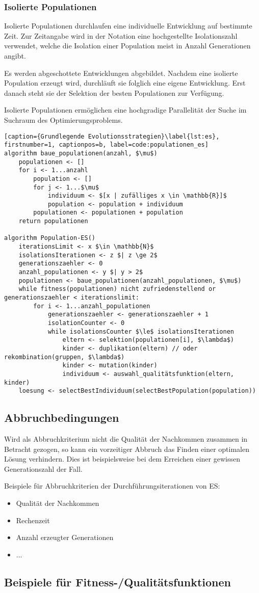 \subsubsection{Isolierte Populationen}

Isolierte Populationen durchlaufen eine individuelle Entwicklung auf bestimmte Zeit.
Zur Zeitangabe wird in der Notation eine hochgestellte Isolationszahl verwendet, welche die Isolation einer Population meist in Anzahl Generationen angibt.

Es werden abgeschottete Entwicklungen abgebildet.
Nachdem eine isolierte Population erzeugt wird, durchläuft sie folglich eine eigene Entwicklung.
Erst danach steht sie der Selektion der besten Populationen zur Verfügung.

Isolierte Populationen ermöglichen eine hochgradige Parallelität der Suche im Suchraum des Optimierungsproblems.

\begin{lstlisting}[caption={Grundlegende Evolutionsstrategien}\label{lst:es}, firstnumber=1, captionpos=b, label=code:populationen_es]
algorithm baue_populationen(anzahl, $\mu$)
	populationen <- []
	for i <- 1...anzahl
		population <- []	
		for j <- 1...$\mu$
			individuum <- $[x | zufälliges x \in \mathbb{R}]$
			population <- population + individuum
		populationen <- populationen + population
	return populationen

algorithm Population-ES()
	iterationsLimit <- x $\in \mathbb{N}$
	isolationsIterationen <- z $| z \ge 2$
	generationszaehler <- 0
	anzahl_populationen <- y $| y > 2$
	populationen <- baue_populationen(anzahl_populationen, $\mu$)
	while fitness(populationen) nicht zufriedenstellend or generationszaehler < iterationslimit:
		for i <- 1...anzahl_populationen
			generationszaehler <- generationszaehler + 1
			isolationCounter <- 0			
			while isolationsCounter $\le$ isolationsIterationen
				eltern <- selektion(populationen[i], $\lambda$)
				kinder <- duplikation(eltern) // oder rekombination(gruppen, $\lambda$)
				kinder <- mutation(kinder)
				individuum <- auswahl_qualitätsfunktion(eltern, kinder)
	loesung <- selectBestIndividuum(selectBestPopulation(population))
\end{lstlisting}

\subsection{Abbruchbedingungen}

Wird als Abbruchkriterium nicht die Qualität der Nachkommen zusammen in Betracht gezogen, so kann ein vorzeitiger Abbruch das Finden einer optimalen Lösung verhindern.
Dies ist beispielsweise bei dem Erreichen einer gewissen Generationszahl der Fall.

Beispiele für Abbruchkriterien der Durchführungsiterationen von ES:
\begin{itemize}
	\item Qualität der Nachkommen
	\item Rechenzeit
	\item Anzahl erzeugter Generationen
	\item ...
\end{itemize}

\subsection{Beispiele für Fitness-/Qualitätsfunktionen}




